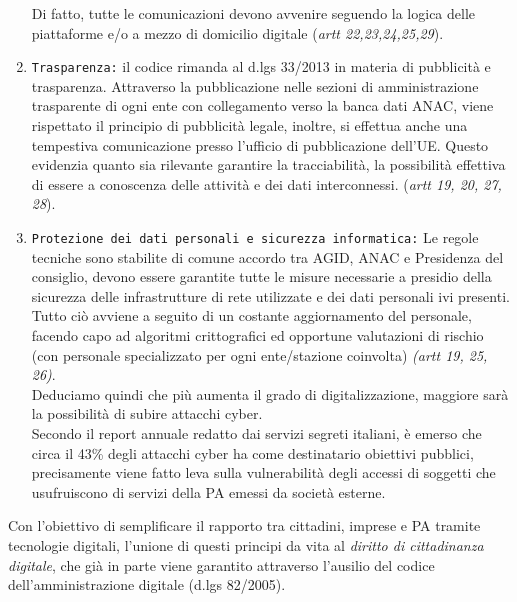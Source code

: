 \documentclass{article}
\begin{document}
\begin{justify}
\begin{enumerate}
        Di fatto, tutte le comunicazioni devono avvenire seguendo la logica delle piattaforme e/o a mezzo di domicilio digitale (\textit{artt 22,23,24,25,29}).
        \item \texttt{Trasparenza:} il codice rimanda al d.lgs 33/2013 in materia di pubblicità e trasparenza.
        Attraverso la pubblicazione nelle sezioni di amministrazione trasparente di ogni ente con collegamento verso la banca dati ANAC, viene rispettato il principio di pubblicità legale, inoltre, si effettua anche una tempestiva comunicazione presso l'ufficio di pubblicazione dell'UE.
        Questo evidenzia quanto sia rilevante garantire la tracciabilità, la possibilità effettiva di essere a conoscenza delle attività e dei dati interconnessi. (\textit{artt 19, 20, 27, 28}).
        \item \texttt{Protezione dei dati personali e sicurezza informatica:}
        Le regole tecniche sono stabilite di comune accordo tra AGID, ANAC e Presidenza del consiglio, devono essere garantite tutte le misure necessarie a presidio della sicurezza delle infrastrutture di rete utilizzate e dei dati personali ivi presenti. Tutto ciò avviene a seguito di un costante aggiornamento del personale, facendo capo ad algoritmi crittografici ed opportune valutazioni di rischio (con personale specializzato per ogni ente/stazione coinvolta) \textit{(artt 19, 25, 26)}. \\Deduciamo quindi che più aumenta il grado di digitalizzazione, maggiore sarà la possibilità di subire attacchi cyber.\\
        Secondo il report annuale redatto dai servizi segreti italiani, è emerso che circa il 43\% degli attacchi cyber ha come destinatario obiettivi pubblici, precisamente viene fatto leva sulla vulnerabilità degli accessi di soggetti che usufruiscono di servizi della PA emessi da società esterne.\citep{ChiomentiPA}\\
    \end{enumerate}
    Con l'obiettivo di semplificare il rapporto tra cittadini, imprese e PA tramite tecnologie digitali, l'unione di questi principi da vita al \textit{diritto di cittadinanza digitale}, che già in parte viene garantito attraverso l'ausilio del codice dell'amministrazione digitale (d.lgs 82/2005).
\end{justify}
\end{document}
